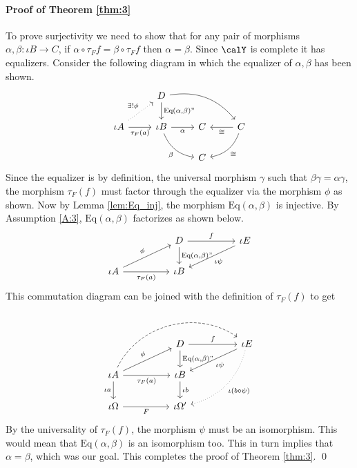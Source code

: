 \documentclass[12pt,oneside]{article}
\begin{document}
\paragraph{Proof of Theorem \ref{thm:3}} To prove surjectivity we need to show that for any pair of morphisms $\alpha, \beta : \iota B \to C$, if $\alpha \circ \tau_F{f} = \beta \circ \tau_F{f}$ then $\alpha = \beta$. Since $\calY$ is complete it has equalizers. Consider the following diagram in which the equalizer of $\alpha, \beta$ has been shown. 
%
\[\begin{tikzcd}
	& D \arrow{d}{\text{Eq}(\alpha, \beta)"} \arrow[rrd, bend left] & & \\
	\iota A \arrow[r, "\tau_F(a)"'] \arrow[ru, "\exists! \phi", dotted] & \iota B \arrow[r, "\alpha"'] \arrow[rd, "\beta"', bend right] & C & C \arrow[l, "\cong"] \arrow[ld, "\cong", bend left] \\
	& & C & 
\end{tikzcd}\]
%
Since the equalizer is by definition, the universal morphism $\gamma$ such that $\beta \gamma = \alpha \gamma$, the morphism $\tau_F(f)$ must factor through the equalizer via the morphism $\phi$ as shown. Now by Lemma \ref{lem:Eq_inj}, the morphism $\text{Eq}(\alpha, \beta)$ is injective. By Assumption \ref{A:3}, $\text{Eq}(\alpha, \beta)$ factorizes as shown below.
%
\[\begin{tikzcd}
	& & D \arrow{d}{\text{Eq}(\alpha, \beta)"} \arrow[rr, "f"] & & \iota E \arrow[lld, "\iota \psi"] \\
	\iota A \arrow[rr, "\tau_F(a)"'] \arrow[rru, "\phi"] & & \iota B & & 
\end{tikzcd}\]
%
This commutation diagram can be joined with the definition of $\tau_F(f)$  to get 
%
\[\begin{tikzcd}
	& & D \arrow{d}{\text{Eq}(\alpha, \beta)"} \arrow[rr, "f"] & & \iota E \arrow[lld, "\iota \psi"] \arrow[lldd, "\iota (b\circ \psi)", dotted, bend left] \\
	\iota A \arrow[rr, "\tau_F(a)"'] \arrow[rru, "\phi"] \arrow[d, "\iota a"'] \arrow[rrrru, dashed, bend left=50] & & \iota B \arrow[d, "\iota b"] & & \\
	\iota \Omega \arrow[rr, "F"'] & & \iota \Omega' & & 
\end{tikzcd}\]
%
By the universality of $\tau_F(f)$, the morphism $\psi$ must be an isomorphism. This would mean that $\text{Eq}(\alpha, \beta)$ is an isomorphism too. This in turn implies that $\alpha=\beta$, which was our goal. This completes the proof of Theorem \ref{thm:3}. \qed 
\end{document}
